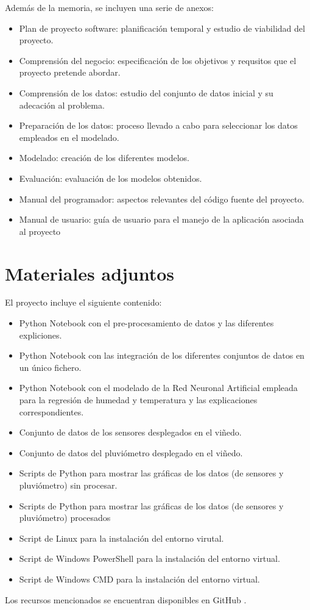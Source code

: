 Además de la memoria, se incluyen una serie de anexos:
\begin{itemize}
    \item Plan de proyecto software: planificación temporal y estudio de viabilidad del proyecto.
    \item Comprensión del negocio: especificación de los objetivos y requsitos que el proyecto pretende abordar.
    \item Comprensión de los datos: estudio del conjunto de datos inicial y su adecación al problema.
    \item Preparación de los datos: proceso llevado a cabo para seleccionar los datos empleados en el modelado.
    \item Modelado: creación de los diferentes modelos.
    \item Evaluación: evaluación de los modelos obtenidos.
    \item Manual del programador: aspectos relevantes del código fuente del proyecto.
    \item Manual de usuario: guía de usuario para el manejo de la aplicación asociada al proyecto
\end{itemize}

\section{Materiales adjuntos}
El proyecto incluye el siguiente contenido:
\begin{itemize}
    \item Python Notebook con el pre-procesamiento de datos y las diferentes expliciones.
    \item Python Notebook con las integración de los diferentes conjuntos de datos en un único fichero.
    \item Python Notebook con el modelado de la Red Neuronal Artificial empleada para la regresión
        de humedad y temperatura y las explicaciones correspondientes.
    \item Conjunto de datos de los sensores desplegados en el viñedo.
    \item Conjunto de datos del pluviómetro desplegado en el viñedo.
    \item Scripts de Python para mostrar las gráficas de los datos (de sensores y pluviómetro) sin procesar.
    \item Scripts de Python para mostrar las gráficas de los datos (de sensores y pluviómetro) procesados
    \item Script de Linux para la instalación del entorno virutal.
    \item Script de Windows PowerShell para la instalación del entorno virtual.
    \item Script de Windows CMD para la instalación del entorno virtual.
\end{itemize}
Los recursos mencionados se encuentran disponibles en GitHub \cite{gabriel:2023}.
